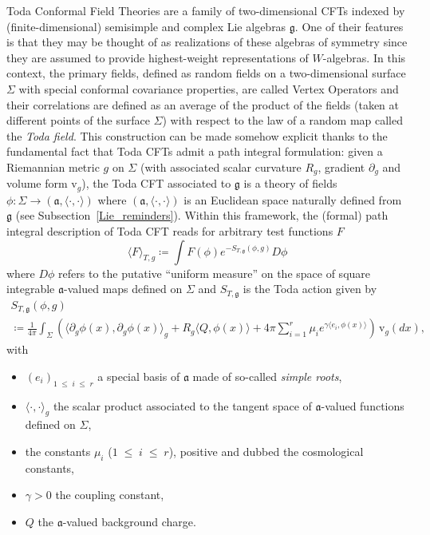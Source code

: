 \documentclass[AHL,Unicode,longabstracts,published]{cedram}
\renewcommand{\leq}{\;\leqslant\;}
\newcommand{\frkg}{\mathfrak{g}}
\newcommand{\frka}{\mathfrak{a}}
\newcommand{\rmv}{\mathrm{v}}
\begin{document}
Toda Conformal Field Theories are a family of two-dimensional CFTs indexed by (finite-dimensional) semisimple and complex Lie algebras $\frkg$. One of their features is that they may be thought of as realizations of these algebras of symmetry since they are assumed to provide highest-weight representations of $W$-algebras. In this context, the primary fields, defined as random fields on a two-dimensional surface $\Sigma$ with special conformal covariance properties, are called Vertex Operators and their correlations are defined as an average of the product of the fields (taken at different points of the surface $\Sigma$) with respect to the law of a random map called the \emph{Toda field}. This construction can be made somehow explicit thanks to the fundamental fact that Toda CFTs admit a path integral formulation: given a Riemannian metric $g$ on $\Sigma$ (with associated scalar curvature $R_g$, gradient $\partial_g$ and volume form $\rmv_g$), the Toda CFT associated to $\frkg$ is a theory of fields $\phi:\Sigma\to (\frka,\langle \cdot, \cdot \rangle)$ where $(\frka,\langle \cdot, \cdot \rangle)$ is an Euclidean space naturally defined from $\frkg$ (see Subsection~\ref{Lie_reminders}). Within this framework, the (formal) path integral description of Toda CFT reads for arbitrary test functions $F$
\begin{equation}\label{partition_function}
\langle F \rangle_{T,g} \coloneqq \int F(\phi)e^{-S_{T,\frkg}(\phi,g)}D \phi
\end{equation}
where $D \phi$ refers to the putative ``uniform measure'' on the space of square integrable $\frka$-valued maps defined on $\Sigma$ and $ S_{T,\frkg}$ is the Toda action given by
\begin{multline}\label{action}
S_{T,\frkg}(\phi,g)\\
\coloneqq \frac{1}{4\pi} \int_{\Sigma} \left (\langle\partial_g \phi(x), \partial_g \phi(x) \rangle_g +R_g \langle Q, \phi(x) \rangle +4\pi \sum_{i=1}^{r} \mu_ie^{\gamma \langle e_i,\phi(x) \rangle} \right)\,\rmv_{g}(dx),
\end{multline}
with
\begin{itemize}
\item $(e_i)_{1\leq i\leq r}$ a special basis of $\frka$ made of so-called \emph{simple roots},
\item $\langle \cdot, \cdot \rangle_g$ the scalar product associated to the tangent space of $\frka$-valued functions defined on $\Sigma$,
\item the constants $\mu_i$ ($1\leq i\leq r$), positive and dubbed the cosmological constants,
\item $\gamma>0$ the coupling constant,
\item $Q$ the $\frka$-valued background charge.
\end{itemize}
\end{document}

